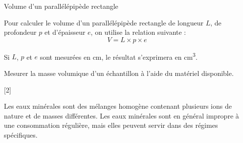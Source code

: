 \begin{doc}{Volume d'un parallélépipède rectangle}
  \begin{multicols}{2}
    Pour calculer le volume d'un parallélépipède rectangle de longueur $L$, de profondeur $p$ et d’épaisseur $e$, on utilise la relation suivante :
    \begin{equation*}
      V = L \times p \times e
    \end{equation*}

    \centering
  \end{multicols}
  Si $L$, $p$ et $e$ sont mesurées en \unit{\cm},
  le résultat s’exprimera en \unit{\cubic\cm}.
\end{doc}

\mesure Mesurer la masse volumique d'un échantillon à l'aide du matériel disponible.

[2]



\begin{importants}
  Les eaux minérales sont des mélanges homogène contenant plusieurs ions de nature et de masses différentes.
  Les eaux minérales sont en général impropre à une consommation régulière, mais elles peuvent servir dans des régimes spécifiques.
  
  \hspace{8pt} 
\end{importants}



